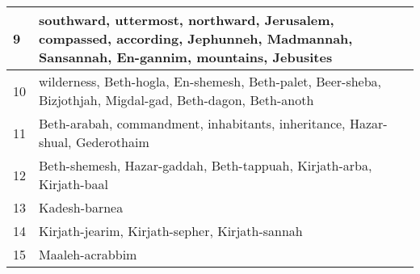 \begin{center}
\begin{longtable}{l|p{3.75in}}
9 & southward, uttermost, northward, Jerusalem, compassed, according, Jephunneh, Madmannah, Sansannah, En-gannim, mountains, Jebusites\\ \hline 
10 & wilderness, Beth-hogla, En-shemesh, Beth-palet, Beer-sheba, Bizjothjah, Migdal-gad, Beth-dagon, Beth-anoth\\ \hline 
11 & Beth-arabah, commandment, inhabitants, inheritance, Hazar-shual, Gederothaim\\ \hline 
12 & Beth-shemesh, Hazar-gaddah, Beth-tappuah, Kirjath-arba, Kirjath-baal\\ \hline 
13 & Kadesh-barnea\\ \hline 
14 & Kirjath-jearim, Kirjath-sepher, Kirjath-sannah\\ \hline 
15 & Maaleh-acrabbim\\ \hline 
\end{longtable}
\end{center}





